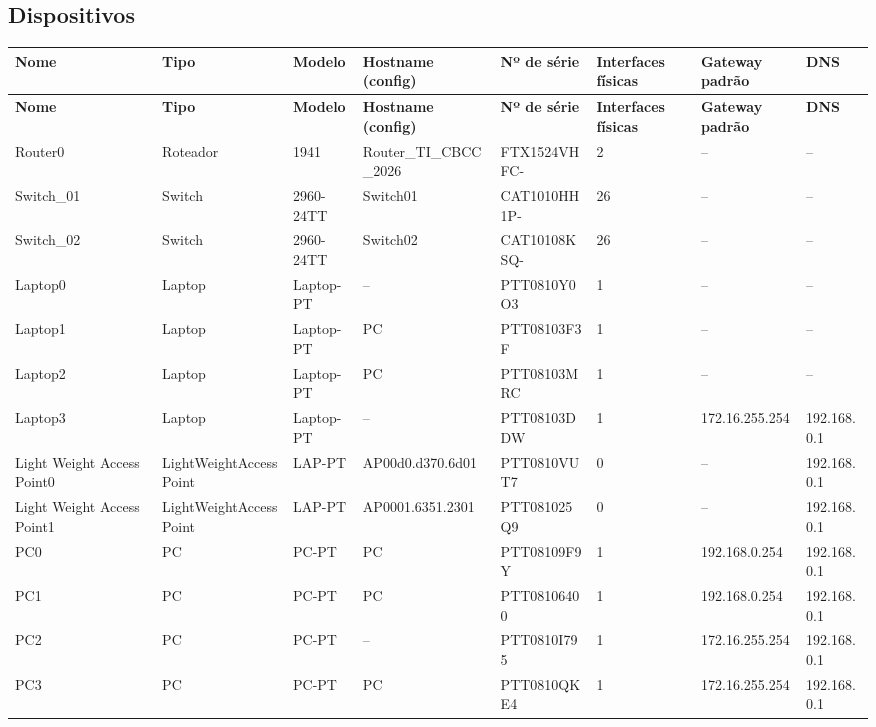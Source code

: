 \subsection{Dispositivos}
\begingroup\scriptsize\setlength{\tabcolsep}{3pt}
\begin{longtable}{@{}p{}p{}p{}p{}p{}p{}p{}p{}@{}}
\toprule \textbf{Nome} & \textbf{Tipo} & \textbf{Modelo} & \textbf{Hostname (config)} & \textbf{Nº de série} & \textbf{Interfaces físicas} & \textbf{Gateway padrão} & \textbf{DNS} \\\midrule\endfirsthead
\toprule \textbf{Nome} & \textbf{Tipo} & \textbf{Modelo} & \textbf{Hostname (config)} & \textbf{Nº de série} & \textbf{Interfaces físicas} & \textbf{Gateway padrão} & \textbf{DNS} \\\midrule\endhead
Router0 & Roteador & 1941 & Router\_TI\_CBCC\_2026 & FTX1524VHFC- & 2 & -- & -- \\
Switch\_01 & Switch & 2960-24TT & Switch01 & CAT1010HH1P- & 26 & -- & -- \\
Switch\_02 & Switch & 2960-24TT & Switch02 & CAT10108KSQ- & 26 & -- & -- \\
Laptop0 & Laptop & Laptop-PT & -- & PTT0810Y0O3 & 1 & -- & -- \\
Laptop1 & Laptop & Laptop-PT & PC & PTT08103F3F & 1 & -- & -- \\
Laptop2 & Laptop & Laptop-PT & PC & PTT08103MRC & 1 & -- & -- \\
Laptop3 & Laptop & Laptop-PT & -- & PTT08103DDW & 1 & 172.16.255.254 & 192.168.0.1 \\
Light Weight Access Point0 & LightWeightAccessPoint & LAP-PT & AP00d0.d370.6d01 & PTT0810VUT7 & 0 & -- & 192.168.0.1 \\
Light Weight Access Point1 & LightWeightAccessPoint & LAP-PT & AP0001.6351.2301 & PTT081025Q9 & 0 & -- & 192.168.0.1 \\
PC0 & PC & PC-PT & PC & PTT08109F9Y & 1 & 192.168.0.254 & 192.168.0.1 \\
PC1 & PC & PC-PT & PC & PTT08106400 & 1 & 192.168.0.254 & 192.168.0.1 \\
PC2 & PC & PC-PT & -- & PTT0810I795 & 1 & 172.16.255.254 & 192.168.0.1 \\
PC3 & PC & PC-PT & PC & PTT0810QKE4 & 1 & 172.16.255.254 & 192.168.0.1 \\

\end{longtable}
